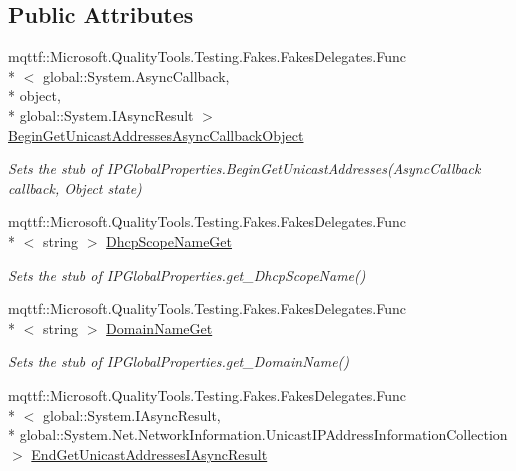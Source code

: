\subsection*{Public Attributes}
\begin{DoxyCompactItemize}
\item 
mqttf\-::\-Microsoft.\-Quality\-Tools.\-Testing.\-Fakes.\-Fakes\-Delegates.\-Func\\*
$<$ global\-::\-System.\-Async\-Callback, \\*
object, \\*
global\-::\-System.\-I\-Async\-Result $>$ \hyperlink{class_system_1_1_net_1_1_network_information_1_1_fakes_1_1_stub_i_p_global_properties_a58cc4a7359fd285ceeff7da5b06cf615}{Begin\-Get\-Unicast\-Addresses\-Async\-Callback\-Object}
\begin{DoxyCompactList}\small\item\em Sets the stub of I\-P\-Global\-Properties.\-Begin\-Get\-Unicast\-Addresses(\-Async\-Callback callback, Object state)\end{DoxyCompactList}\item 
mqttf\-::\-Microsoft.\-Quality\-Tools.\-Testing.\-Fakes.\-Fakes\-Delegates.\-Func\\*
$<$ string $>$ \hyperlink{class_system_1_1_net_1_1_network_information_1_1_fakes_1_1_stub_i_p_global_properties_a60526d58362cb3acfeb9065564fa7389}{Dhcp\-Scope\-Name\-Get}
\begin{DoxyCompactList}\small\item\em Sets the stub of I\-P\-Global\-Properties.\-get\-\_\-\-Dhcp\-Scope\-Name()\end{DoxyCompactList}\item 
mqttf\-::\-Microsoft.\-Quality\-Tools.\-Testing.\-Fakes.\-Fakes\-Delegates.\-Func\\*
$<$ string $>$ \hyperlink{class_system_1_1_net_1_1_network_information_1_1_fakes_1_1_stub_i_p_global_properties_a2e7d7f85e1b431268492f99bee5f85c5}{Domain\-Name\-Get}
\begin{DoxyCompactList}\small\item\em Sets the stub of I\-P\-Global\-Properties.\-get\-\_\-\-Domain\-Name()\end{DoxyCompactList}\item 
mqttf\-::\-Microsoft.\-Quality\-Tools.\-Testing.\-Fakes.\-Fakes\-Delegates.\-Func\\*
$<$ global\-::\-System.\-I\-Async\-Result, \\*
global\-::\-System.\-Net.\-Network\-Information.\-Unicast\-I\-P\-Address\-Information\-Collection $>$ \hyperlink{class_system_1_1_net_1_1_network_information_1_1_fakes_1_1_stub_i_p_global_properties_a5afb74fb9f784593bb2cec5e6b6eb21a}{End\-Get\-Unicast\-Addresses\-I\-Async\-Result}

\end{DoxyCompactItemize}
